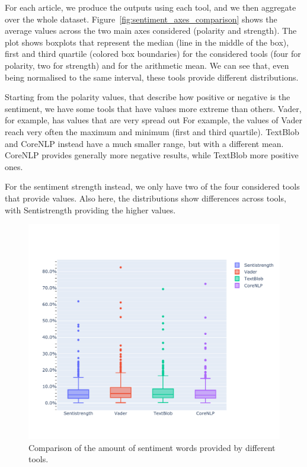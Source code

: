For each article, we produce the outputs using each tool, and we then aggregate over the whole dataset.
Figure~\ref{fig:sentiment_axes_comparison} shows the average values across the two main axes considered (polarity and strength).
The plot shows boxplots that represent the median (line in the middle of the box), first and third quartile (colored box boundaries) for the considered tools (four for polarity, two for strength) and for the arithmetic mean.
We can see that, even being normalised to the same interval, these tools provide different distributions.

Starting from the polarity values, that describe how positive or negative is the sentiment, we have some tools that have values more extreme than others.
Vader, for example, has values that are very spread out
For example, the values of Vader reach very often the maximum and minimum (first and third quartile).
TextBlob and CoreNLP instead have a much smaller range, but with a different mean. CoreNLP provides generally more negative results, while TextBlob more positive ones.

For the sentiment strength instead, we only have two of the four considered tools that provide values.
Also here, the distributions show differences across tools, with Sentistrength providing the higher values.



\begin{figure}
    \centering
    \includegraphics[trim={0 1.5cm 0 2cm},clip,width=\textwidth]{figures/sentiment_words_comparison.pdf}
    \caption{Comparison of the amount of sentiment words provided by different tools.}
    \label{fig:sentiment_words_comparison}
\end{figure}

